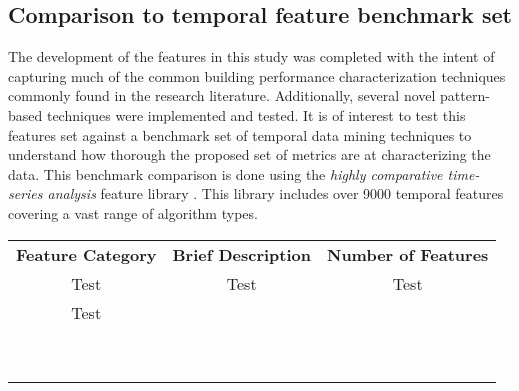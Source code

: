 \subsection{Comparison to temporal feature benchmark set}
\label{sec:hctsa_benchmark}

The development of the features in this study was completed with the intent of capturing much of the common building performance characterization techniques commonly found in the research literature. Additionally, several novel pattern-based techniques were implemented and tested. It is of interest to test this features set against a benchmark set of temporal data mining techniques to understand how thorough the proposed set of metrics are at characterizing the data. This benchmark comparison is done using the \emph{highly comparative time-series analysis} feature library \cite{Fulcher_2013}. This library includes over 9000 temporal features covering a vast range of algorithm types.


\begin{table} 
    \begin{tabular}{ c c c }
        \textbf{Feature Category} & \textbf{Brief Description} & \textbf{Number of Features} \\
        Test & Test & Test \\ 
        Test &  &  \\ 
         &  &  \\ 
         &  &  \\ 
         &  &  \\ 
         &  &  \\ 
         &  &  \\ 
         &  &  \\ 
         &  &  \\ 
         &  &  \\ 
         &  &  \\ 
    \end{tabular} 
\end{table}


